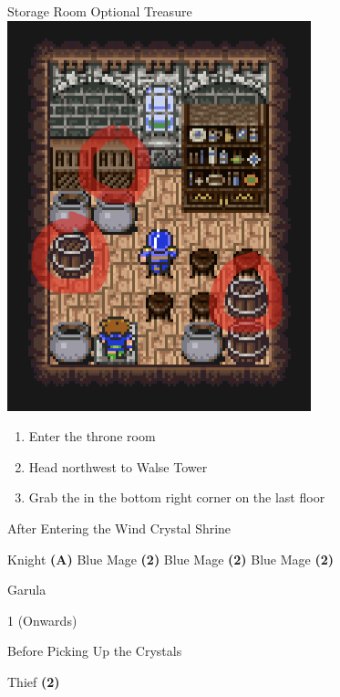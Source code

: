 \begin{paracol}{2}
\switchcolumn
\begin{misc}{Storage Room Optional Treasure}
    \includegraphics[scale=.399]{../Graphics/Misc/4. Walse Castle Optional Pickups.png}
\end{misc}

\switchcolumn
\resume
\begin{enumerate}[resume]
    \item Enter the throne room
    \item Head northwest to Walse Tower
    \item Grab the  in the bottom right corner on the last floor
\end{enumerate}

\begin{menu}{After Entering the Wind Crystal Shrine}
	\varwb
    \begin{jobMenu}
        \faris Knight \textbf{(A)}
        \galuf Blue Mage \textbf{(2\pointLeft)} \optimize
        \lenna Blue Mage \textbf{(2\pointLeft)} \optimize
        \bartz Blue Mage \textbf{(2\pointLeft)} \optimize
	\end{jobMenu}
    \begin{itemMenu}
        \potionMenu {}
    \end{itemMenu}
    \varwe
\end{menu}

\begin{boss}{Garula}
    \varwb
    \begin{round}{1 (Onwards)}
        \faris \leftCommand{\guard}
        \everyoneElse \leftCommand{\blue} \then \goblinPunch
    \end{round}
    \varwe
\end{boss}

\begin{menu}{Before Picking Up the Crystals}
	\varwb
    \begin{jobMenu}
        \bartz Thief \textbf{(2\pointRight)} \ability{!\black} \optimize
	\end{jobMenu}
    \varwe
\end{menu}

\end{paracol}